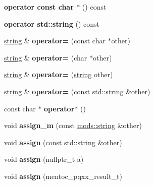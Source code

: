 \begin{DoxyCompactItemize}
{\bfseries operator const char $\ast$} () const
\item 
\mbox{\label{structmods_1_1string_a2fafc554acaacbfe5166efdf348f1c7c}} 
{\bfseries operator std\+::string} () const
\item 
\mbox{\label{structmods_1_1string_add027d279a1fed3ae3b3acb1f788e3ea}} 
\hyperlink{structmods_1_1string}{string} \& {\bfseries operator=} (const char $\ast$other)
\item 
\mbox{\label{structmods_1_1string_afea1f063b6ce10fa3f7d21e2e7e0150d}} 
\hyperlink{structmods_1_1string}{string} \& {\bfseries operator=} (char $\ast$other)
\item 
\mbox{\label{structmods_1_1string_af4f52dde4e59e5d155153b0d16b00374}} 
\hyperlink{structmods_1_1string}{string} \& {\bfseries operator=} (\hyperlink{structmods_1_1string}{string} other)
\item 
\mbox{\label{structmods_1_1string_a63aa82bfefeeeb53dbdb6350f9aee103}} 
\hyperlink{structmods_1_1string}{string} \& {\bfseries operator=} (const std\+::string \&other)
\item 
\mbox{\label{structmods_1_1string_a98b0b2a624327dce6914166a28406f1f}} 
const char $\ast$ {\bfseries operator$\ast$} ()
\item 
\mbox{\label{structmods_1_1string_acce72549fb03a97aa410579a8c5b64d3}} 
void {\bfseries assign\+\_\+m} (const \hyperlink{structmods_1_1string}{mods\+::string} \&other)
\item 
\mbox{\label{structmods_1_1string_a73f04058ccd484bf833fbd3741dd7a75}} 
void {\bfseries assign} (const std\+::string \&other)
\item 
\mbox{\label{structmods_1_1string_aaf3d9b12cfe95d0f6fb5ef011d5a6973}} 
void {\bfseries assign} (nullptr\+\_\+t a)
\item 
\mbox{\label{structmods_1_1string_a67b88f72ab89207661bbd3b9599d9b47}} 
void {\bfseries assign} (mentoc\+\_\+pqxx\+\_\+result\+\_\+t)

\end{DoxyCompactItemize}

